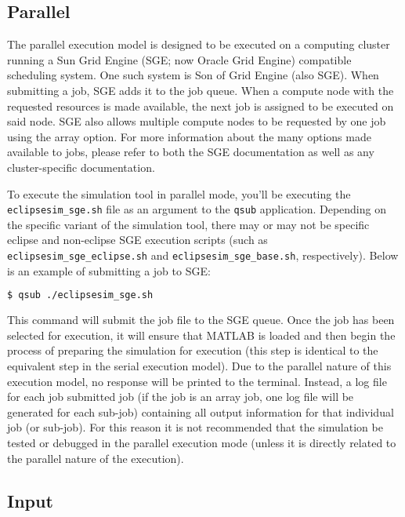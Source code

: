 \documentclass[12pt,letterpaper]{article}
\begin{document}
\subsection{Parallel}
\label{sec:usage:parallel}

The parallel execution model is designed to be executed on a computing cluster
running a Sun Grid Engine (SGE; now Oracle Grid Engine) compatible scheduling
system. One such system is Son of Grid Engine (also SGE). When submitting a job,
SGE adds it to the job queue. When a compute node with the requested resources
is made available, the next job is assigned to be executed on said node. SGE
also allows multiple compute nodes to be requested by one job using the array
option. For more information about the many options made available to jobs,
please refer to both the SGE documentation as well as any cluster-specific
documentation.

To execute the simulation tool in parallel mode, you'll be executing the {\tt
  eclipsesim\_sge.sh} file as an argument to the {\tt qsub}
application. Depending on the specific variant of the simulation tool, there may
or may not be specific eclipse and non-eclipse SGE execution scripts (such as
{\tt eclipsesim\_sge\_eclipse.sh} and {\tt eclipsesim\_sge\_base.sh},
respectively). Below is an example of submitting a job to SGE:

\begin{lstlisting}[language=bash]
  $ qsub ./eclipsesim_sge.sh
\end{lstlisting}

This command will submit the job file to the SGE queue. Once the job has been
selected for execution, it will ensure that MATLAB is loaded and then begin the
process of preparing the simulation for execution (this step is identical to the
equivalent step in the serial execution model). Due to the parallel nature of
this execution model, no response will be printed to the terminal. Instead, a
log file for each job submitted job (if the job is an array job, one log file
will be generated for each sub-job) containing all output information for that
individual job (or sub-job). For this reason it is not recommended that the
simulation be tested or debugged in the parallel execution mode (unless it is
directly related to the parallel nature of the execution).

\subsection{Input}
\label{sec:usage:input}
\end{document}
